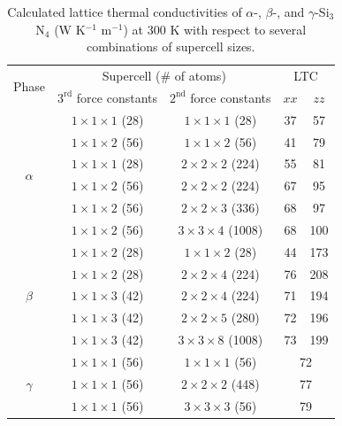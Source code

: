 \documentclass[twocolumn,amsmath,amssymb,a4paper,prb,superscriptaddress,floatfix]{revtex4-1}
\begin{document}
\begin{table}[ht]
	\caption{\label{table:LTC} Calculated lattice thermal conductivities 
 of $\alpha$-, $\beta$-, and $\gamma$-Si$_3$N$_4$
 (W K$^{-1}$ m$^{-1}$) at 300 K with respect to several combinations of
 supercell sizes.}
 \begin{ruledtabular}
  \begin{tabular}{ccccc}
   \multirow{2}{*}{Phase}
   & \multicolumn{2}{c}{Supercell (\# of atoms)} &
   \multicolumn{2}{c}{LTC} \\
   \cline{2-5}
   & $3^\text{rd}$ force constants & $2^\text{nd}$ force constants & $xx$ & $zz$ \\
   \hline
   \multirow{6}{*}{$\alpha$}
   & $1\times 1\times 1$ (28) & $1\times
   1\times 1$ (28) & 37 &   57 \\ 
   & $1\times 1\times 2$ (56) & $1\times
   1\times 2$ (56) & 41 &   79 \\ 
   & $1\times 1\times 1$ (28) & $2\times
   2\times 2$ (224) & 55 &   81 \\ 
   & $1\times 1\times 2$ (56) & $2\times
   2\times 2$ (224) & 67 &   95 \\ 
   & $1\times 1\times 2$ (56) & $2\times
   2\times 3$ (336) & 68 &  97 \\ 
   & $1\times 1\times 2$ (56) & $3\times
   3\times 4$ (1008) & 68 &  100 \\ 
   \hline
   \multirow{5}{*}{$\beta$}
   & $1\times 1\times 2$ (28) & $1\times
   1\times 2$ (28) & 44 & 173 \\ 
   & $1\times 1\times 2$ (28) & $2\times
   2\times 4$ (224) & 76 &  208 \\ 
   & $1\times 1\times 3$ (42) & $2\times
   2\times 4$ (224) & 71 & 194 \\ 
   & $1\times 1\times 3$ (42) & $2\times
   2\times 5$ (280) & 72 & 196 \\ 
   & $1\times 1\times 3$ (42) & $3\times
   3\times 8$ (1008) & 73 & 199 \\ 
   \hline
   \multirow{3}{*}{$\gamma$}
   & $1\times 1\times 1$ (56) & $1\times
   1\times 1$ (56) & \multicolumn{2}{c}{72} \\ 
   & $1\times 1\times 1$ (56) & $2\times
   2\times 2$ (448) & \multicolumn{2}{c}{77} \\ 
   & $1\times 1\times 1$ (56) & $3\times
   3\times 3$ (56) & \multicolumn{2}{c}{79} \\ 
  \end{tabular}
 \end{ruledtabular}
\end{table}
\end{document}
